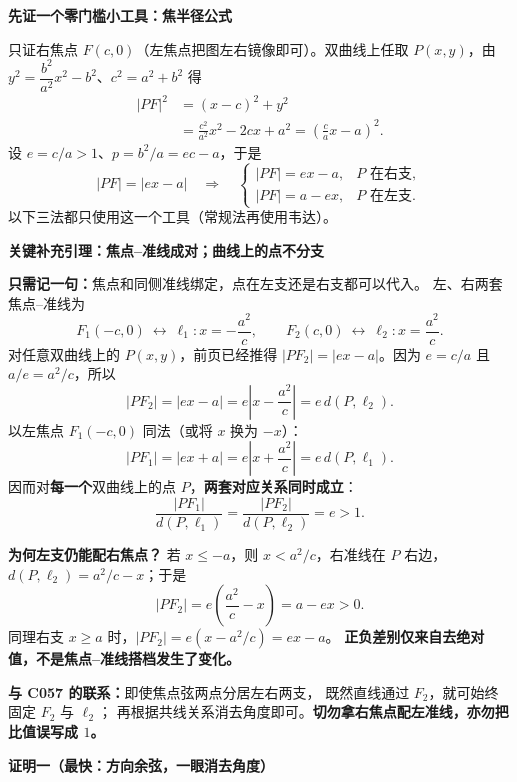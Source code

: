 \clearpage
\begin{proofbox}
  \textbf{\textcolor{CProof}{先证一个零门槛小工具：焦半径公式}}

  只证右焦点 $F(c,0)$（左焦点把图左右镜像即可）。双曲线上任取 $P(x,y)$，由
  $y^2=\dfrac{b^2}{a^2}x^2-b^2$、$c^2=a^2+b^2$ 得
  \[
    \begin{aligned}
      |PF|^2&=(x-c)^2+y^2\\
      &=\frac{c^2}{a^2}x^2-2cx+a^2
       =\left(\frac ca x-a\right)^2.
    \end{aligned}
  \]
  设 $e=c/a>1$、$p=b^2/a=ec-a$，于是
  \[
    \boxed{|PF|=|ex-a|}
    \quad\Longrightarrow\quad
    \begin{cases}
      |PF|=ex-a,&P\text{ 在右支},\\
      |PF|=a-ex,&P\text{ 在左支}.
    \end{cases}
  \]
  以下三法都只使用这一个工具（常规法再使用韦达）。

  \medskip
\end{proofbox}\clearpage\begin{proofbox}
  \textbf{\textcolor{CProof}{关键补充引理：焦点--准线成对；曲线上的点不分支}}

  \textbf{只需记一句：}焦点和同侧准线绑定，点在左支还是右支都可以代入。
  左、右两套焦点--准线为
  \[
    F_1(-c,0)\ \leftrightarrow\ \ell_1:x=-\frac{a^2}{c},\qquad
    F_2(c,0)\ \leftrightarrow\ \ell_2:x=\frac{a^2}{c}.
  \]
  对任意双曲线上的 $P(x,y)$，前页已经推得
  $|PF_2|=|ex-a|$。因为 $e=c/a$ 且 $a/e=a^2/c$，所以
  \[
    \boxed{|PF_2|=|ex-a|
     =e\left|x-\frac{a^2}{c}\right|
     =e\,d(P,\ell_2)}.
  \]
  以左焦点 $F_1(-c,0)$ 同法（或将 $x$ 换为 $-x$）：
  \[
    \boxed{|PF_1|=|ex+a|
     =e\left|x+\frac{a^2}{c}\right|
     =e\,d(P,\ell_1)}.
  \]
  因而对\textbf{每一个}双曲线上的点 $P$，\textbf{两套对应关系同时成立}：
  \[
    \boxed{\frac{|PF_1|}{d(P,\ell_1)}
      =\frac{|PF_2|}{d(P,\ell_2)}=e>1}.
  \]

  \textbf{为何左支仍能配右焦点？}
  若 $x\le -a$，则 $x<a^2/c$，右准线在 $P$ 右边，
  $d(P,\ell_2)=a^2/c-x$；于是
  \[
     |PF_2|=e\left(\frac{a^2}{c}-x\right)=a-ex>0.
  \]
  同理右支 $x\ge a$ 时，$|PF_2|=e(x-a^2/c)=ex-a$。
  \textbf{正负差别仅来自去绝对值，不是焦点--准线搭档发生了变化。}

  \textbf{与 C057 的联系：}即使焦点弦两点分居左右两支，
  既然直线通过 $F_2$，就可始终固定 $F_2$ 与 $\ell_2$；
  再根据共线关系消去角度即可。\textbf{切勿拿右焦点配左准线，亦勿把比值误写成 $1$。}
\end{proofbox}\clearpage\begin{proofbox}
  \textbf{\textcolor{CProof}{证明一（最快：方向余弦，一眼消去角度）}}


\end{proofbox}
